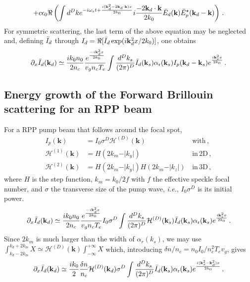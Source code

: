 \documentclass[
 reprint,
 amsmath,amssymb,
 aps,
]{revtex4-1}
\begin{document}
\begin{widetext}
\begin{align}
  \nonumber\\
 +c\epsilon_0  \Re\left( \int d^Dk e^{-i\omega_s t+\frac{ i( \mathbf{k}_d^2-2\mathbf{k}_d\cdot \mathbf{k} )x}{2k_0}} 
i\frac{ -2\mathbf{k}_d\cdot \mathbf{k}}{2k_0} \Bar{E}_d(\mathbf{k})\Bar{E}_p^\star(\mathbf{k}_d-\mathbf{k} )
  \right)
\, . \label{eq:g2}
\end{align}
For symmetric scattering, the last term  of the above equation may be neglected and, defining $\Bar{I}_d$ through $I_d = \Re[\Bar{I}_d\exp(i\mathbf{k}_d^2x/2k_0)]$, one obtains
 \begin{align}
\partial_x\Bar{I}_d(\mathbf{k}_d)\simeq  \frac{ik_0n_0}{2n_c} \frac{e^{\frac{-i\mathbf{k}_d^2x}{2k_0}} }{  v_g n_c T_e}   
  \int \frac{d^Dk_s}{(2\pi)^D} \Bar{I}_d(\mathbf{k}_s) \alpha_\mathrm{r}(\mathbf{k}_s) 
I_p(\mathbf{k}_d-\mathbf{k}_s)
e^{\frac{i\mathbf{k}_s^2x}{2k_0}} 
\, . \label{eq:g3}
\end{align}
 
 \subsection{Energy growth of the Forward Brillouin scattering for an RPP beam }
 For a RPP pump beam that follows around the focal spot, 
   \begin{align}
   I_p(\mathbf{k}) &= I_0 \sigma ^D \mathcal{H}^{(D)}(\mathbf{k})  &\,  \mathrm{with} \, ,\\ 
   \mathcal{H}^{(1)}(\mathbf{k}) &= H(2k_m - \vert k_y \vert ) &\,  \mathrm{in}\, \mathrm{2D} \, ,\\ 
    \mathcal{H}^{(2)}(\mathbf{k}) &=   H(2k_m - \vert k_y \vert ) H(2k_m - \vert k_z \vert ) &\,  \mathrm{in}\, \mathrm{3D} \, ,
   \end{align} 
     where $H$ is the step function, $k_m=k_0/2f$ with $f$ the effective speckle focal number,  and $\sigma$ the transverse size of the pump wave, \emph{i.e.}, $I_0\sigma^D$ is its initial power.
  \begin{align}
\partial_x\Bar{I}_d(\mathbf{k}_d)\simeq  \frac{ik_0n_0}{2n_c} \frac{e^{\frac{-i\mathbf{k}_d^2x}{2k_0}} }{  v_g n_c T_e}   
 I_0\sigma^D \int \frac{d^Dk_s}{(2\pi)^D}   \mathcal{H}^{(D)}(\mathbf{k}_s) \Bar{I}_d(\mathbf{k}_s) \alpha_\mathrm{r}(\mathbf{k}_s) 
e^{\frac{i\mathbf{k}_s^2x}{2k_0}} 
\, . \label{eq:g4}
\end{align}
Since $2k_m$ is much larger than the width of $\alpha_r(k_s)$, we may use $\int_{k_d-2k_m}^{k_d+2k_m} X \simeq \mathcal{H}^{(D)}(\mathbf{k}) \int_{-\infty}^{+\infty}X$
which, introducing $\delta n/n_c=n_0I_0/{n_c^2 T_ev_g}$, gives
 \begin{align}
\partial_x\Bar{I}_d(\mathbf{k}_d)\simeq  \frac{ik_0}{2}  \frac{\delta n}{n_c}
 \mathcal{H}^{(D)}(\mathbf{k}_d)\sigma^D  \int \frac{d^Dk_s}{(2\pi)^D} \Bar{I}_d(\mathbf{k}_s) \alpha_\mathrm{r}(\mathbf{k}_s) 
e^{\frac{i(\mathbf{k}_s^2-\mathbf{k}_d^2)x}{2k_0}} 
\, . \label{eq:g5}
\end{align}


\end{widetext}
\end{document}
